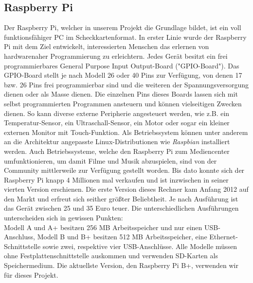 \documentclass[journal]{IEEEtran}
\begin{document}
\subsection{Raspberry Pi}
Der Raspberry Pi, welcher in unserem Projekt die Grundlage bildet, ist ein voll funktionsfähiger PC im Scheckkartenformat. 
In erster Linie wurde der Raspberry Pi mit dem Ziel entwickelt, interessierten Menschen das erlernen von hardwarenaher Programmierung zu erleichtern.
Jedes Gerät besitzt ein frei programmierbares General Purpose Input Output-Board ("GPIO-Board").
Das GPIO-Board stellt je nach Modell 26 oder 40 Pins zur Verfügung, von denen 17 bzw. 26 Pins frei programmierbar sind und die weiteren der Spannungsversorgung dienen oder als Masse dienen.
Die einzelnen Pins dieses Boards lassen sich mit selbst programmierten Programmen ansteuern und können vielseitigen Zwecken dienen.
So kann diverse externe Peripherie angesteuert werden, wie z.B. ein Temperatur-Sensor, ein Ultraschall-Sensor, ein Motor oder sogar ein kleiner externen Monitor mit Touch-Funktion.
Als Betriebssystem können unter anderem an die Architektur angepasste Linux-Distributionen wie \textit{Raspbian} installiert werden. 
Auch Betriebssysteme, welche den Raspberry Pi zum Mediencenter umfunktionieren, um damit Filme und Musik abzuspielen, sind von der Community mittlerweile zur Verfügung gestellt worden.
Bis dato konnte sich der Raspberry Pi knapp 4 Millionen mal verkaufen und ist inzwischen in seiner vierten Version erschienen. \cite{verkaufszahlen}
Die erste Version dieses Rechner kam Anfang 2012 auf den Markt und erfreut sich seither größter Beliebtheit.
Je nach Ausführung ist das Gerät zwischen 25 und 35 Euro teuer. 
Die unterschiedlichen Ausführungen unterscheiden sich in gewissen Punkten: \\
Modell A und A+ besitzen 256 MB Arbeitsspeicher und nur einen USB-Anschluss, Modell B und B+ besitzen 512 MB Arbeitsspeicher, eine Ethernet-Schnittstelle sowie zwei, respektive vier USB-Anschlüsse.
Alle Modelle müssen ohne Festplattenschnittstelle auskommen und verwenden SD-Karten als Speichermedium.
Die aktuellste Version, den Raspberry Pi B+, verwenden wir für dieses Projekt.\\
\end{document}
